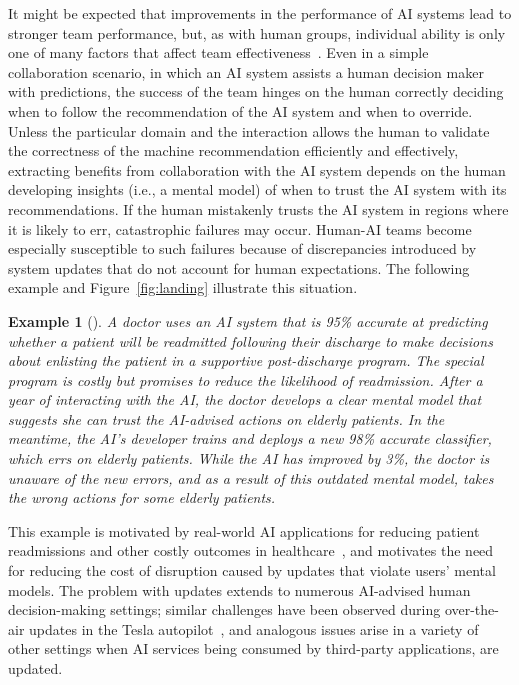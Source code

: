 \documentclass[letterpaper]{article} %
\newcommand{\?}{\mbox{?}}
\newtheorem*{example}{Example}
\begin{document}
It might be expected that improvements in the performance of AI systems lead to stronger team performance, but, as with human groups, individual ability is only one of many factors that affect team effectiveness~\cite{dechurch-jap10,grosz1996collaborative}. Even in a simple collaboration scenario, in which an AI system assists a human decision maker with predictions, the success of the team hinges on the human correctly deciding when to follow the recommendation of the AI system and when to override. Unless the particular domain and the interaction allows the human to validate the correctness of the machine recommendation efficiently and effectively, extracting benefits from collaboration with the AI system depends on the human developing insights (i.e., a mental model) of when to trust the AI system with its recommendations. If the human mistakenly trusts the AI system in regions where it is likely to err, catastrophic failures may occur. 
Human-AI teams become especially susceptible to such failures because of discrepancies introduced by system updates that do not account for human expectations. The following example and Figure~\ref{fig:landing} illustrate this situation.


\begin{example}[]
A doctor uses an AI system that is 95\% accurate at predicting whether a patient will be readmitted following their discharge to make decisions about enlisting the patient in a supportive post-discharge program. The special program is costly but promises to reduce the likelihood of readmission. After a year of interacting with the AI, the doctor develops a clear mental model that suggests she can trust the AI-advised actions on elderly patients. In the meantime, the AI's developer trains and deploys a new 98\% accurate classifier, which errs on elderly patients. 
While the AI has improved by 3\%, the doctor is unaware of the new errors, and as a result of this outdated mental model, takes the wrong actions for some elderly patients.
\end{example}

This example is motivated by real-world AI applications for reducing patient readmissions and other costly outcomes in healthcare~\cite{bayati2014data,wiens2016patient,caruana2015intelligible}, and motivates the need for reducing the cost of disruption caused by updates that violate  %
users' mental models. The problem with updates extends to numerous AI-advised human decision-making settings; similar challenges have been observed during over-the-air updates in the Tesla autopilot~\cite{tesla:2018}, and  analogous issues arise in a variety of other settings when AI services 
being consumed by third-party applications, are updated.
\end{document}
